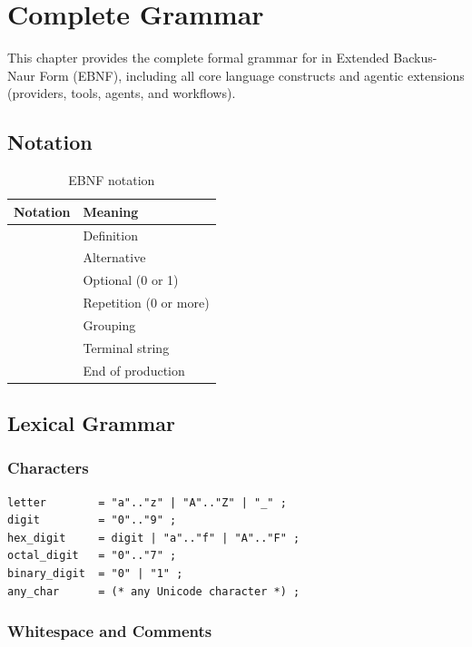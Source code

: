 \chapter{Complete Grammar}
\label{ch:grammar}

This chapter provides the complete formal grammar for \haira{} in Extended Backus-Naur Form (EBNF), including all core language constructs and agentic extensions (providers, tools, agents, and workflows).

\section{Notation}

\begin{table}[h]
\centering
\begin{tabular}{ll}
\toprule
\textbf{Notation} & \textbf{Meaning} \\
\midrule
\code{=} & Definition \\
\code{|}  & Alternative \\
\code{[ ... ]} & Optional (0 or 1) \\
\code{\{ ... \}} & Repetition (0 or more) \\
\code{( ... )} & Grouping \\
\code{"..."} & Terminal string \\
\code{;} & End of production \\
\bottomrule
\end{tabular}
\caption{EBNF notation}
\end{table}

\section{Lexical Grammar}

\subsection{Characters}

\begin{lstlisting}[language=EBNF]
letter        = "a".."z" | "A".."Z" | "_" ;
digit         = "0".."9" ;
hex_digit     = digit | "a".."f" | "A".."F" ;
octal_digit   = "0".."7" ;
binary_digit  = "0" | "1" ;
any_char      = (* any Unicode character *) ;
\end{lstlisting}

\subsection{Whitespace and Comments}

